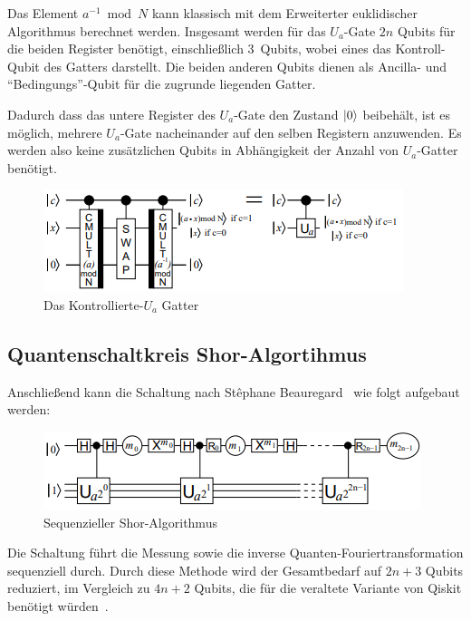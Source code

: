 \documentclass[a4paper,journal]{IEEEtran}
\begin{document}
Das Element \(a^{-1} \bmod N\) kann klassisch
mit dem Erweiterter euklidischer Algorithmus berechnet werden.
Insgesamt werden für das \(U_a\)-Gate \(2n\) Qubits für die beiden Register benötigt,
einschließlich \(3\)~Qubits, wobei eines das Kontroll-Qubit des Gatters darstellt.
Die beiden anderen Qubits dienen als Ancilla- und "`Bedingungs"'-Qubit für die zugrunde liegenden Gatter.

Dadurch dass das untere Register des \(U_a\)-Gate den Zustand \(\ket{0}\) beibehält,
ist es möglich, mehrere \(U_a\)-Gate nacheinander auf den selben Registern anzuwenden.
Es werden also keine zusätzlichen Qubits in Abhängigkeit der Anzahl von \(U_a\)-Gatter benötigt. 

\begin{figure}[h]
\caption{Das Kontrollierte-\(U_a\) Gatter~\cite{beauregard2003circuit}}
\label{fig:c-Ugate}
\includegraphics[width=\linewidth]{c-Ugate2.PNG}
\centering
\end{figure}

\subsection{Quantenschaltkreis Shor-Algortihmus}
Anschließend kann die Schaltung nach
Stêphane Beauregard~\cite{beauregard2003circuit} wie folgt aufgebaut werden:
\begin{figure}[!h]
\caption{Sequenzieller Shor-Algorithmus~\cite{beauregard2003circuit}}
\label{fig:Shor-Algorithmus}
\includegraphics[width=\linewidth]{Shor-Algorithmus.PNG}
\centering
\end{figure}

Die Schaltung führt die Messung sowie die inverse Quanten-Fouriertransformation sequenziell durch.
Durch diese Methode wird der Gesamtbedarf auf \(2n+3\) Qubits reduziert,
im Vergleich zu \(4n+2\) Qubits,
die für die veraltete Variante von Qiskit benötigt würden~\cite{IBM:Shor_docu}.
\end{document}
